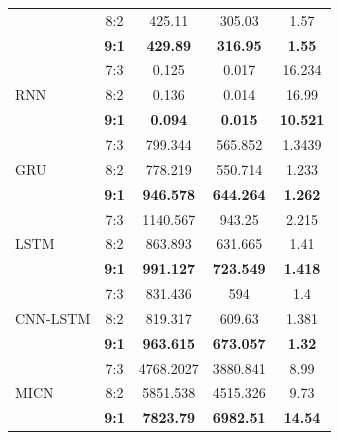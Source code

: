 \documentclass[conference]{IEEEtran}
\begin{document}
\begin{table}[h]
\begin{tabular}{lcccc}
                        & 8:2 & 425.11 & 305.03 & 1.57 \\
                        & \textbf{9:1} & \textbf{429.89} & \textbf{316.95} & \textbf{1.55} \\
                        \midrule
\multirow{3}{*}{RNN} & 7:3 & 0.125 & 0.017 & 16.234 \\
                        & 8:2 & 0.136 & 0.014 & 16.99 \\
                        & \textbf{9:1} & \textbf{0.094} & \textbf{0.015} & \textbf{10.521} \\ \midrule
\multirow{3}{*}{GRU} & 7:3 & 799.344 & 565.852 & 1.3439 \\
                        & 8:2 & 778.219 & 550.714 & 1.233 \\
                        & \textbf{9:1} & \textbf{946.578} & \textbf{644.264} & \textbf{1.262} \\ \midrule
\multirow{3}{*}{LSTM} & 7:3 & 1140.567 & 943.25 & 2.215 \\
                        & 8:2 & 863.893 & 631.665 & 1.41 \\
                        & \textbf{9:1} & \textbf{991.127} & \textbf{723.549} & \textbf{1.418} \\ \midrule
\multirow{3}{*}{CNN-LSTM} & 7:3 & 831.436 & 594 & 1.4 \\
                        & 8:2 & 819.317 & 609.63 & 1.381 \\
                        & \textbf{9:1} & \textbf{963.615} & \textbf{673.057} & \textbf{1.32} \\
\multirow{3}{*}{MICN} & 7:3 & 4768.2027 & 3880.841 & 8.99 \\
                        & 8:2 & 5851.538 & 4515.326 & 9.73 \\
                        & \textbf{9:1} & \textbf{7823.79} & \textbf{6982.51} & \textbf{14.54} \\ \bottomrule
\end{tabular}
\end{table}
\end{document}
